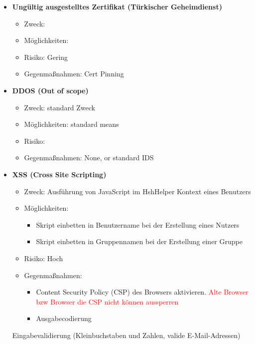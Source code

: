 \documentclass[12pt,DIV14,BCOR10mm,a4paper,twoside,parskip=half-,headsepline,headinclude,english,ngerman,bibliography=totocnumbered]{scrreprt}
\begin{document}
\begin{itemize}
  \item \textbf{Ungültig ausgestelltes Zertifikat (Türkischer Geheimdienst)}
  \begin{itemize}
  \item Zweck:
  \item Möglichkeiten:
  \item Risiko: Gering
  \item Gegenmaßnahmen: Cert Pinning
  \end{itemize}

  \item \textbf{DDOS (Out of scope)}
  \begin{itemize}
  \item Zweck: standard Zweck
  \item Möglichkeiten: standard means
  \item Risiko:
  \item Gegenmaßnahmen: None, or standard IDS
  \end{itemize}

  \item \textbf{XSS (Cross Site Scripting)}
  \begin{itemize}
  \item Zweck: Ausführung von JavaScript im HshHelper Kontext eines Benutzers
  \item Möglichkeiten:
  	\begin{itemize}
          \item Skript einbetten in Benutzername bei der Erstellung eines Nutzers
          \item Skript einbetten in Gruppennamen bei der Erstellung einer Gruppe
      \end{itemize}
  \item Risiko: Hoch
  \item Gegenmaßnahmen:
	\begin{itemize}
		\item Content Security Policy (CSP) des Browsers aktivieren. \textcolor{red}{Alte Browser bzw Browser die CSP nicht können aussperren} %
	
		\item Ausgabecodierung
	\end{itemize}	  
  \end{itemize}
      Eingabevalidierung (Kleinbuchstaben und Zahlen, valide E-Mail-Adressen)


\end{itemize}
\end{document}

